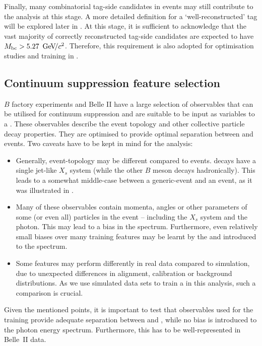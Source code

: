 Finally, many combinatorial tag-side candidates in \BB events may still contribute to the analysis at this stage.
A more detailed definition for a `well-reconstructed' tag will be explored later in .
At this stage, it is sufficient to acknowledge that the vast majority of correctly reconstructed tag-side candidates are expected to have \mbox{${M_{\mathrm{bc}}}>5.27~{\mathrm{\,Ge\kern -0.1em V\!/}c^2}$}.
Therefore, this requirement is also adopted for optimisation studies and training in .

\subsection{Continuum suppression feature selection}\label{sec:continuum_features}

$B$ factory experiments and Belle II have a large selection of observables that can be utilised for continuum suppression and are suitable to be input as variables to a \BDT.
These observables describe the event topology and other collective particle decay properties. 
They are optimised to provide optimal separation between \BB and \qqbar events.
Two caveats have to be kept in mind for the \BtoXsgamma analysis:
\begin{itemize}
    \item Generally, \BtoXsgamma event-topology may be different compared to \BB events. 
    \BtoXsgamma decays have a single jet-like $X_s$ system (while the other $B$ meson decays hadronically).
    This leads to a somewhat middle-case between a generic-\BB event and an \epem\ra\qqbar event, as it was illustrated in .
    \item Many of these observables contain momenta, angles or other parameters of some (or even all) particles in the event -- including the $X_s$ system and the photon.
    This may lead to a bias in the \EB spectrum.
    Furthermore, even relatively small biases over many training features may be learnt by the \BDT and introduced to the spectrum.
    \item Some features may perform differently in real data compared to simulation, due to unexpected differences in alignment, calibration or background distributions.
    As we use simulated data sets to train a \BDT in this analysis, such a comparison is crucial.
\end{itemize}
Given the mentioned points, it is important to test that observables used for the training provide adequate separation between \BtoXsgamma and \qqbar, while no bias is introduced to the photon energy spectrum.
Furthermore, this has to be well-represented in Belle~II data.

